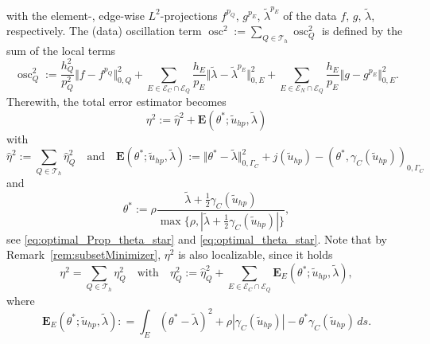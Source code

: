 \documentclass[12pt,twoside,reqno]{amsart}
\theoremstyle{definition}
\numberwithin{equation}{section}
\newcommand{\E} {\bm{E}}
\newcommand  {\T}   {\mathscr T}
\newcommand{\norm}[1]    {\Vert #1 \Vert}
\begin{document}
            with the element-, edge-wise $L^2$-projections $f^{p_Q}$, $g^{p_E}$, $\tilde{\lambda}^{p_E}$ of the data $f$, $g$, $\tilde{\lambda}$, respectively. 
            The (data) oscillation term $\operatorname{osc}^2:=\sum\limits_{Q\in\T_h}\operatorname{osc}_Q^2$ is defined by the sum of the local terms
            \begin{equation*}
                \operatorname{osc}_Q^2:= \frac{h_Q^2}{p_Q^2}\norm{f-f^{p_Q}}_{0,Q}^2+\sum\limits_{E\in \mathcal{E}_C\cap\mathcal{E}_Q}\frac{h_E}{p_E}\norm{\tilde{\lambda}-\tilde{\lambda}^{p_E}}_{0,E}^2 + \sum\limits_{E\in\mathcal{E}_N\cap\mathcal{E}_Q}\frac{h_E}{p_E}\norm{g-g^{p_E}}_{0,E}^2.
            \end{equation*}
            Therewith, the total error estimator becomes 
            \begin{equation*} %
                \eta^2:=\hat{\eta}^2+\bm{E}(\theta^*;\tilde{u}_{hp},\tilde{\lambda})
            \end{equation*}     
            with
            \begin{equation*}
                \hat\eta^2:=\sum\limits_{Q\in \T_h}\hat\eta_Q^2 \quad \text{and} \quad \bm{E}(\theta^*;\tilde{u}_{hp},\tilde{\lambda}):=\norm{\theta^*-\tilde{\lambda}}_{0,\Gamma_C}^2+ j(\tilde{u}_{hp})-(\theta^*,\gamma_C(\tilde{u}_{hp}))_{0,\Gamma_C}
            \end{equation*}
            and
            \begin{equation*}
                \theta^*:=\rho\frac{\tilde{\lambda}+\frac12\gamma_C(\tilde{u}_{hp})}{\max\{\rho,|\tilde{\lambda}+\frac12\gamma_C(\tilde{u}_{hp})|\}},
            \end{equation*}
            see \eqref{eq:optimal_Prop_theta_star} and \eqref{eq:optimal_theta_star}. Note that by Remark~\ref{rem:subsetMinimizer}, $\eta^2$ is also localizable, since it holds
            $$ \eta^2 = \sum\limits_{Q\in \T_h} \eta^2_Q \quad \text{with} \quad \eta^2_Q:=  \hat\eta_Q^2 + \sum\limits_{E\in \mathcal{E}_C\cap\mathcal{E}_Q} \E_E(\theta^*;\tilde{u}_{hp},\tilde{\lambda}), $$
            where
$$ \E_E(\theta^*;\tilde{u}_{hp},\tilde{\lambda}): = \int_E (\theta^*-\tilde{\lambda})^2 + \rho |\gamma_C(\tilde{u}_{hp})| - \theta^*\gamma_C(\tilde{u}_{hp}) \, ds. $$
\end{document}
